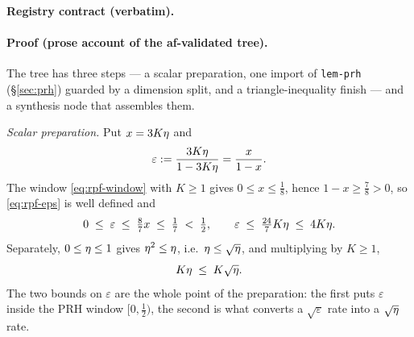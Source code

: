 \noindent\textbf{Registry contract (verbatim).}

\paragraph{Proof (prose account of the af-validated tree).}
The tree has three steps --- a scalar preparation, one import of \texttt{lem-prh}
(\S\ref{sec:prh}) guarded by a dimension split, and a triangle-inequality finish --- and a
synthesis node that assembles them.

\emph{Scalar preparation.} Put $x=3K\eta$ and
\begin{equation}\label{eq:rpf-eps}
  \varepsilon:=\frac{3K\eta}{1-3K\eta}=\frac{x}{1-x}.
\end{equation}
The window \eqref{eq:rpf-window} with $K\ge1$ gives $0\le x\le\tfrac18$, hence
$1-x\ge\tfrac78>0$, so \eqref{eq:rpf-eps} is well defined and
\[
  0\;\le\;\varepsilon\;\le\;\tfrac87x\;\le\;\tfrac17\;<\;\tfrac12,
  \qquad
  \varepsilon\;\le\;\tfrac{24}{7}K\eta\;\le\;4K\eta .
\]
Separately, $0\le\eta\le1$ gives $\eta^{2}\le\eta$, i.e.\
$\eta\le\sqrt{\eta}$, and multiplying by $K\ge1$,
\begin{equation}\label{eq:rpf-root}
  K\eta\;\le\;K\sqrt{\eta}.
\end{equation}
The two bounds on $\varepsilon$ are the whole point of the preparation: the first puts
$\varepsilon$ inside the PRH window $[0,\tfrac12)$, the second is what converts a
$\sqrt{\varepsilon}$ rate into a $\sqrt{\eta}$ rate.

